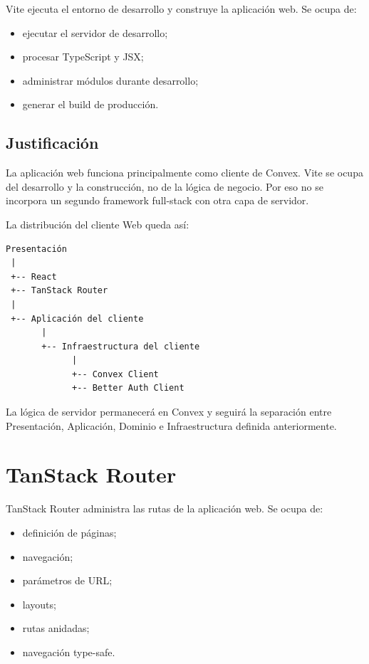 \documentclass[11pt,a4paper]{article}
\begin{document}
Vite ejecuta el entorno de desarrollo y construye la aplicación web. Se ocupa
de:

\begin{itemize}
  \item ejecutar el servidor de desarrollo;
  \item procesar TypeScript y JSX;
  \item administrar módulos durante desarrollo;
  \item generar el build de producción.
\end{itemize}

\subsection{Justificación}

La aplicación web funciona principalmente como cliente de Convex. Vite se
ocupa del desarrollo y la construcción, no de la lógica de negocio. Por eso no
se incorpora un segundo framework full-stack con otra capa de servidor.

La distribución del cliente Web queda así:

\begin{lstlisting}
Presentación
 |
 +-- React
 +-- TanStack Router
 |
 +-- Aplicación del cliente
       |
       +-- Infraestructura del cliente
             |
             +-- Convex Client
             +-- Better Auth Client
\end{lstlisting}

La lógica de servidor permanecerá en Convex y seguirá la separación entre
Presentación, Aplicación, Dominio e Infraestructura definida anteriormente.

\section{TanStack Router}

TanStack Router administra las rutas de la aplicación web. Se ocupa de:

\begin{itemize}
  \item definición de páginas;
  \item navegación;
  \item parámetros de URL;
  \item layouts;
  \item rutas anidadas;
  \item navegación type-safe.
\end{itemize}
\end{document}
